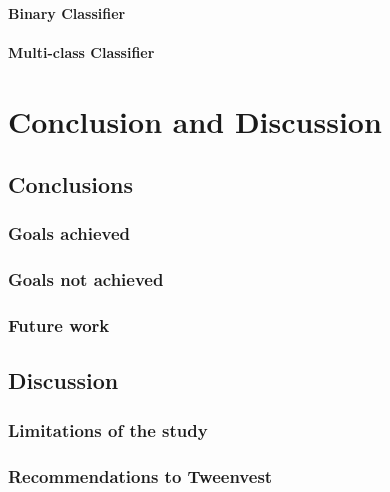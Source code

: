 \documentclass[11pt,english,a4paper,hidelinks]{book}
\begin{document}
\subsubsection{Binary Classifier}

\subsubsection{Multi-class Classifier}




\chapter{Conclusion and Discussion}

\section{Conclusions}

\subsection{Goals achieved}

\subsection{Goals not achieved}

\subsection{Future work}


\section{Discussion}
\subsection{Limitations of the study}

\subsection{Recommendations to Tweenvest}



\printbibliography[heading=bibintoc, title=Bibliography]
\label{sec:biblio}
\newpage
\end{document}
